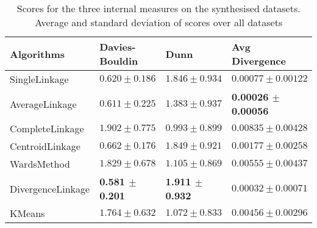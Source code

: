 
\begin{table}
\caption{Scores for the three internal measures on the synthesised datasets.  Average and standard deviation of scores over all datasets}\label{tab:avg_dim}
\begin{tabularx}{\textwidth}{Xl|l|l}
\hline      
Algorithms								&Davies-Bouldin  &Dunn		&Avg Divergence\\
\hline 
SingleLinkage         					&$0.620 \pm 0.186$&$1.846 \pm 0.934$&$0.00077 \pm 0.00122$\\      
AverageLinkage         					&$0.611 \pm 0.225$&$1.383 \pm 0.937$&\textbf{0.00026 $\pm$ 0.00056}\\        
CompleteLinkage      					&$1.902 \pm 0.775$&$0.993 \pm 0.899$&$0.00835 \pm 0.00428$\\        
CentroidLinkage        					&$0.662 \pm 0.176$&$1.849 \pm 0.921$&$0.00177 \pm 0.00258$\\       
WardsMethod          					&$1.829 \pm 0.678$&$1.105 \pm 0.869$&$0.00555 \pm 0.00437$\\      
DivergenceLinkage      					&\textbf{0.581 $\pm$ 0.201}&\textbf{1.911 $\pm$ 0.932}&$0.00032 \pm 0.00071$\\ 
KMeans									&$1.764 \pm 0.632$&$1.072 \pm 0.833$&$0.00456 \pm 0.00296$\\
\hline
\end{tabularx}
\end{table}





